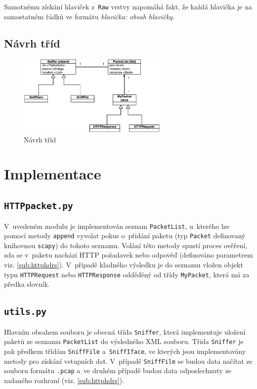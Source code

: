 \documentclass[a4paper, 11pt, titlepage]{article}
\begin{document}
	Samotnému získání hlaviček z~\texttt{Raw} vrstvy napomáhá fakt, že každá hlavička je na samostatném řádků ve formátu 
	\textit{hlavička: obsah hlavičky}. 

	\subsection{Návrh tříd}

	\begin{figure}[htbp]
		\centering
		\includegraphics[width=0.65\textwidth]{./img/class.eps}
		\caption{Návrh tříd}
		\label{fig:label}
	\end{figure}




\section{Implementace} %
\label{sec:Implementace}

	\subsection{\texttt{HTTPpacket.py}} %
	\label{sub:HTTPpacket.py}
	V~uvedeném modulu je implementován seznam \texttt{PacketList}, u~kterého lze pomocí metody \texttt{append} vyvolat
	pokus o~přidání paketu (typ \texttt{Packet} definovaný knihovnou \texttt{scapy}) do tohoto seznamu. 
	Volání této metody spustí proces ověření, zda se v~paketu nachází HTTP požadavek nebo odpověď (definováno parametrem viz. \ref{sub:httphdrs}).
	V~případě kladného výsledku je do seznamu vložen objekt typu \texttt{HTTPRequest} nebo \texttt{HTTPResponse} odděděný
	od třídy \texttt{MyPacket}, která má za předka slovník. 

	\subsection{\texttt{utils.py}} %
	\label{sub:utils.py}
	Hlavním obsahem souboru je obecná třída \texttt{Sniffer}, která implementuje uložení paketů ze seznamu \texttt{PacketList}
	do výsledného XML souboru. Třída \texttt{Sniffer} je pak předkem třídám \texttt{SniffFile} a~\texttt{SniffIface}, ve kterých
	jsou implementovány metody pro získání vstupních dat. V~případě \texttt{SniffFile} se budou data načítat ze souboru 
	formátu \texttt{.pcap} a~ve druhém případě budou data odposlechnuty ze zadaného rozhraní (viz. \ref{sub:httphdrs}).
\end{document}
